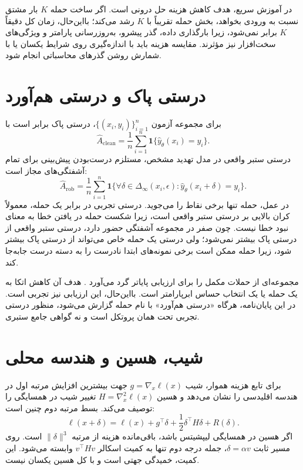 در آموزش سریع، هدف کاهش هزینه حل درونی است. اگر ساخت حمله $K$ بار مشتق نسبت به ورودی بخواهد، بخش حمله تقریباً با $K$ رشد می‌کند؛ بااین‌حال، زمان کل دقیقاً $K$ برابر نمی‌شود، زیرا بارگذاری داده، گذر پیشرو، به‌روزرسانی پارامتر و ویژگی‌های سخت‌افزار نیز مؤثرند. مقایسه هزینه باید با اندازه‌گیری روی شرایط یکسان یا با شمارش روشن گذرهای محاسباتی انجام شود.

\section{درستی پاک و درستی هم‌آورد}
برای مجموعه آزمون $\{(x_i,y_i)\}_{i=1}^n$، درستی پاک برابر است با
\begin{equation}
\widehat A_{\mathrm{clean}}=\frac1n\sum_{i=1}^n
\mathbf1\{\widehat y_\theta(x_i)=y_i\}.
\end{equation}
درستی ستبر واقعی در مدل تهدید مشخص، مستلزم درست‌بودن پیش‌بینی برای تمام آشفتگی‌های مجاز است:
\begin{equation}\label{eq:true-robust}
\widehat A_{\mathrm{rob}}=\frac1n\sum_{i=1}^n
\mathbf1\{\forall\delta\in\Delta_\infty(x_i,\epsilon):
\widehat y_\theta(x_i+\delta)=y_i\}.
\end{equation}
در عمل، حمله تنها برخی نقاط را می‌جوید. درستی تجربی در برابر یک حمله، معمولاً کران بالایی بر درستی ستبر واقعی است، زیرا شکست حمله در یافتن خطا به معنای نبود خطا نیست. چون صفر در مجموعه آشفتگی حضور دارد، درستی ستبر واقعی از درستی پاک بیشتر نمی‌شود؛ ولی درستی یک حمله خاص می‌تواند از درستی پاک بیشتر شود، زیرا حمله ممکن است برخی نمونه‌های ابتدا نادرست را به دسته درست جابه‌جا کند.

 مجموعه‌ای از حملات مکمل را برای ارزیابی پایاتر گرد می‌آورد \cite{croce2020reliable}. هدف آن کاهش اتکا به یک حمله یا یک انتخاب حساس ابرپارامتر است. بااین‌حال، این ارزیابی نیز تجربی است. در این پایان‌نامه، هرگاه «درستی هم‌آورد» با نام حمله گزارش می‌شود، منظور درستی تجربی تحت همان پروتکل است و نه گواهی جامع ستبری.

\section{شیب، هسین و هندسه محلی}
برای تابع هزینه هموار، شیب $g=\nabla_x\ell(x)$ جهت بیشترین افزایش مرتبه اول در هندسه اقلیدسی را نشان می‌دهد و هسین $H=\nabla_x^2\ell(x)$ تغییر شیب در همسایگی را توصیف می‌کند. بسط مرتبه دوم چنین است:
\begin{equation}\label{eq:quadratic}
\ell(x+\delta)=\ell(x)+g^\top\delta+\frac{1}{2}\delta^\top H\delta+R(\delta).
\end{equation}
اگر هسین در همسایگی لیپشیتس باشد، باقی‌مانده هزینه از مرتبه $\|\delta\|^3$ است. روی مسیر ثابت $\delta=\alpha v$، جمله درجه دوم تنها به کمیت اسکالر $v^\top Hv$ وابسته می‌شود. این کمیت، خمیدگی جهتی است و با کل هسین یکسان نیست.

